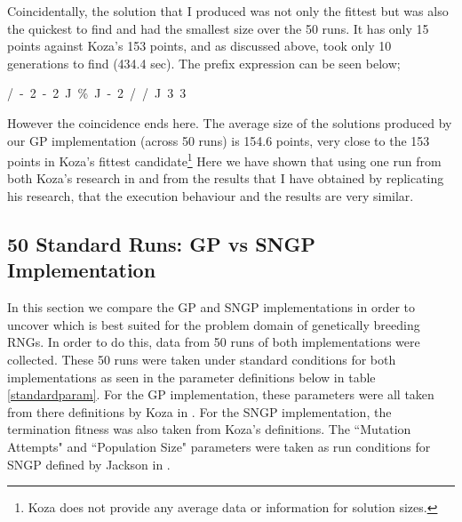 \documentclass[a4paper,10.5pt]{article}
\begin{document}
Coincidentally, the solution that I produced was not only the fittest but was also the quickest to find and had the smallest size over the 50 runs. It has only 15 points against Koza's 153 points, and as discussed above, took only 10 generations to find (434.4 sec). The prefix expression can be seen below;
\begin{center}
/\ -\ 2\ -\ 2\ J\ \%\ J\ -\ 2\ /\ /\ J\ 3\ 3
\end{center}
However the coincidence ends here. The average size of the solutions produced by our GP implementation (across 50 runs) is 154.6 points, very close to the 153 points in Koza's fittest candidate\footnote{Koza does not provide any average data or information for solution sizes.}
Here we have shown that using one run from both Koza's research in \cite{kozarng} and from the results that I have obtained by replicating his research, that the execution behaviour and the results are very similar.


\subsection{50 Standard Runs: GP vs SNGP Implementation}
\label{gpvssngp}

In this section we compare the GP and SNGP implementations in order to uncover which is best suited for the problem domain of genetically breeding RNGs. In order to do this, data from 50 runs of both implementations were collected. These 50 runs were taken under standard conditions for both implementations as seen in the parameter definitions below in table \ref{standardparam}. For the GP implementation, these parameters were all taken from there definitions by Koza in \cite[p.6]{kozarng}. For the SNGP implementation, the termination fitness was also taken from Koza's definitions. The ``Mutation Attempts" and ``Population Size" parameters were taken as run conditions for SNGP defined by Jackson in \cite[p.54]{jacksonsngp}. %
\end{document}
